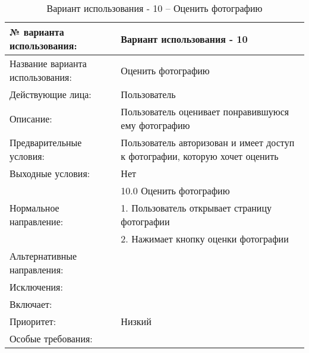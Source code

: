 \begin{table}[H]
  \caption{\onehalfspacing Вариант использования - 10 – Оценить фотографию}\label{use-case-10-table}
  \begin{tabular}{|p{6cm}|p{10cm}|}
  \hline № варианта использования: & Вариант использования - 10 \\
  \hline Название варианта использования: & Оценить фотографию \\
  \hline Действующие лица: & Пользователь \\
  \hline Описание: & Пользователь оценивает понравившуюся ему фотографию \\
  \hline Предварительные условия: & Пользователь авторизован и имеет доступ к фотографии, которую хочет оценить \\
  \hline Выходные условия: & Нет \\
  \hline \multirow{3}{*}{Нормальное направление:} & 10.0 Оценить фотографию \\
  \cline{2-2} & 1. Пользователь открывает страницу фотографии \\
  \cline{2-2} & 2. Нажимает кнопку оценки фотографии \\
  \hline Альтернативные направления: &  \\
  \hline Исключения: &  \\
  \hline Включает: &  \\
  \hline Приоритет: & Низкий \\
  \hline Особые требования: &  \\
  \hline 
  \end{tabular}
\end{table}

